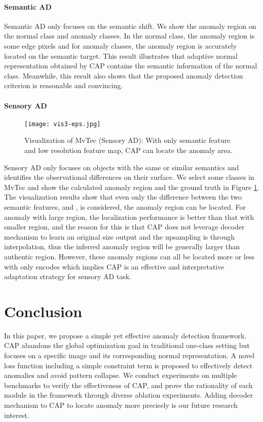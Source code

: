 \documentclass{article}
\begin{document}
\paragraph{Semantic AD}
Semantic AD only focuses on the semantic shift. We show the anomaly region on the normal class and anomaly classes. In the normal class, the anomaly region is some edge pixels and for anomaly classes, the anomaly region is accurately located on the semantic target. This result illustrates that adaptive normal representation obtained by CAP contains the semantic information of the normal class. Meanwhile, this result also shows that the proposed anomaly detection criterion is reasonable and convincing.

\paragraph{Sensory AD}

\begin{figure}[h]
\centering
	\texttt{[image: vis3-eps.jpg]}
	\caption{Visualization of MvTec (Sensory AD): With only semantic feature and low resolution feature map, CAP can locate the anomaly area.}
	\label{fig:vis2}
\end{figure}

Sensory AD only focuses on objects with the same or similar semantics and identifies the observational differences on their surface. We select some classes in MvTec and show the calculated anomaly region and the ground truth in Figure \ref{fig:vis2}. The visualization results show that even only the difference between the two semantic features,  and , is considered, the anomaly region can be located. For anomaly with large region, the localization performance is better than that with smaller region, and the reason for this is that CAP does not leverage decoder mechanism to learn an original size output and the upsampling is through interpolation, thus the inferred anomaly region will be generally larger than authentic region. However, these anomaly regions can all be located more or less with only encodes which implies CAP is an effective and interpretative adaptation strategy for sensory AD task.

\section{Conclusion}

In this paper, we propose a simple yet effective anomaly detection framework. CAP abandons the global optimization goal in traditional one-class setting but focuses on a specific image and its corresponding normal representation. A novel loss function including a simple constraint term is proposed to effectively detect anomalies and avoid pattern collapse. We conduct experiments on multiple benchmarks to verify the effectiveness of CAP, and prove the rationality of each module in the framework through diverse ablation experiments. Adding decoder mechanism to CAP to locate anomaly more precisely is our future research interest.
\end{document}
